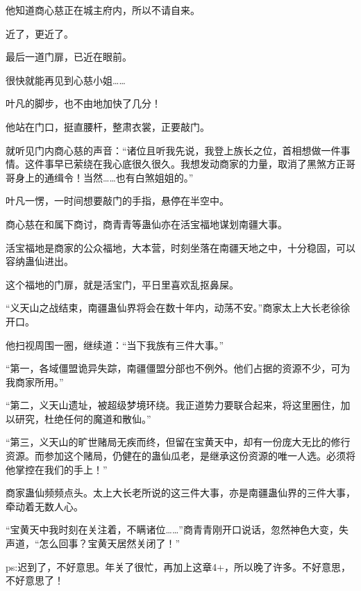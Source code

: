 \begin{this_body}
他知道商心慈正在城主府内，所以不请自来。

近了，更近了。

最后一道门扉，已近在眼前。

很快就能再见到心慈小姐……

叶凡的脚步，也不由地加快了几分！

他站在门口，挺直腰杆，整肃衣裳，正要敲门。

就听见门内商心慈的声音：“诸位且听我先说，我登上族长之位，首相想做一件事情。这件事早已萦绕在我心底很久很久。我想发动商家的力量，取消了黑煞方正哥哥身上的通缉令！当然……也有白煞姐姐的。”

叶凡一愣，一时间想要敲门的手指，悬停在半空中。

商心慈在和属下商讨，商青青等蛊仙亦在活宝福地谋划南疆大事。

活宝福地是商家的公众福地，大本营，时刻坐落在南疆天地之中，十分稳固，可以容纳蛊仙进出。

这个福地的门扉，就是活宝门，平日里喜欢乱抠鼻屎。

“义天山之战结束，南疆蛊仙界将会在数十年内，动荡不安。”商家太上大长老徐徐开口。

他扫视周围一圈，继续道：“当下我族有三件大事。”

“第一，各域僵盟诡异失踪，南疆僵盟分部也不例外。他们占据的资源不少，可为我商家所用。”

“第二，义天山遗址，被超级梦境环绕。我正道势力要联合起来，将这里圈住，加以研究，杜绝任何的魔道和散仙。”

“第三，义天山的旷世赌局无疾而终，但留在宝黄天中，却有一份庞大无比的修行资源。而参加这个赌局，仍健在的蛊仙瓜老，是继承这份资源的唯一人选。必须将他掌控在我们的手上！”

商家蛊仙频频点头。太上大长老所说的这三件大事，亦是南疆蛊仙界的三件大事，牵动着无数人心。

“宝黄天中我时刻在关注着，不瞒诸位……”商青青刚开口说话，忽然神色大变，失声道，“怎么回事？宝黄天居然关闭了！”

ps:迟到了，不好意思。年关了很忙，再加上这章4+，所以晚了许多。不好意思，不好意思了！

\end{this_body}

